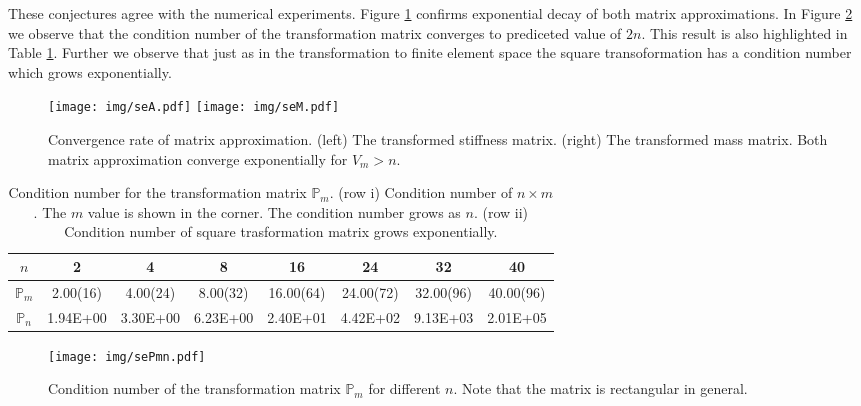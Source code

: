 \documentclass[a4paper,10pt]{article}
\newcommand{\Pmat}{\ensuremath{\mathbb{P}_m}}                  %
\begin{document}
  These conjectures agree with the numerical experiments. Figure \ref{fig:se_mat}
  confirms exponential decay of both matrix approximations. In Figure
  \ref{fig:se_P} we observe that the condition number of the transformation
  matrix converges to prediceted value of $2n$. This result is also highlighted
  in Table \ref{tab:se_P}. Further we observe that just as in the transformation
  to finite element space the square transoformation has a condition number
  which grows exponentially.

  \begin{figure}
  \begin{center}
    \texttt{[image: img/seA.pdf]}
    \texttt{[image: img/seM.pdf]}
  \end{center}
  \label{fig:se_mat}
  \caption{Convergence rate of matrix approximation. (left) The transformed
    stiffness matrix. (right) The transformed mass matrix.
    Both matrix approximation converge exponentially for $V_m>n$.
  }
  \end{figure}

  \begin{table}
    \begin{center}
    \begin{tabular}{|c||c|c|c|c|c|c|c|}
      \hline
      $n$ & 2& 4& 8& 16& 24& 32& 40\\
      \hline\hline
      $\Pmat$ & 2.00(16)& 4.00(24)& 8.00(32)& 16.00(64)& 24.00(72)& 32.00(96)&40.00(96) \\
      \hline
      $\mathbb{P}_{n}$ & 1.94E+00& 3.30E+00& 6.23E+00& 2.40E+01& 4.42E+02&
      9.13E+03& 2.01E+05 \\
      \hline
    \end{tabular}
  \caption{Condition number for the transformation matrix $\Pmat$.
    (row i) Condition number of $n\times m$. The $m$ value
    is shown in the corner. The condition number grows as $n$.
    (row ii) Condition number of square trasformation matrix grows
    exponentially.}
  \label{tab:se_P}
  \end{center}
  \end{table}

  \begin{figure}
  \begin{center}
    \texttt{[image: img/sePmn.pdf]}
  \end{center}
  \label{fig:se_P}
  \caption{Condition number of the transformation matrix $\Pmat$ for different $n$.
    Note that the matrix is rectangular in general.}
  \end{figure}
\end{document}
